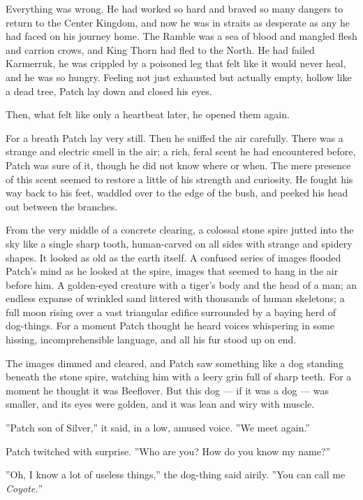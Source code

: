 \documentclass[12pt]{book}
\begin{document}
Everything was wrong. He had worked so hard and braved so many dangers
to return to the Center Kingdom, and now he was in straits as
desperate as any he had faced on his journey home. The Ramble was a
sea of blood and mangled flesh and carrion crows, and King Thorn had
fled to the North. He had failed Karmerruk, he was crippled by a
poisoned leg that felt like it would never heal, and he was so
hungry. Feeling not just exhausted but actually empty, hollow like a
dead tree, Patch lay down and closed his eyes.

Then, what felt like only a heartbeat later, he opened them again.

For a breath Patch lay very still. Then he sniffed the air
carefully. There was a strange and electric smell in the air; a rich,
feral scent he had encountered before, Patch was sure of it, though he
did not know where or when. The mere presence of this scent seemed to
restore a little of his strength and curiosity. He fought his way back
to his feet, waddled over to the edge of the bush, and peeked his head
out between the branches.

From the very middle of a concrete clearing, a colossal stone spire
jutted into the sky like a single sharp tooth, human-carved on all
sides with strange and spidery shapes. It looked as old as the earth
itself. A confused series of images flooded Patch's mind as he looked
at the spire, images that seemed to hang in the air before him. A
golden-eyed creature with a tiger's body and the head of a man; an
endless expanse of wrinkled sand littered with thousands of human
skeletons; a full moon rising over a vast triangular edifice
surrounded by a baying herd of dog-things. For a moment Patch thought
he heard voices whispering in some hissing, incomprehensible language,
and all his fur stood up on end.

The images dimmed and cleared, and Patch saw something like a dog
standing beneath the stone spire, watching him with a leery grin full
of sharp teeth. For a moment he thought it was Beeflover. But this dog
--- if it was a dog --- was smaller, and its eyes were golden, and it
was lean and wiry with muscle.

''Patch son of Silver,'' it said, in a low, amused voice. ''We meet
again.''

Patch twitched with surprise. ''Who are you? How do you know my
name?''

''Oh, I know a lot of useless things,'' the dog-thing said
airily. ''You can call me \textit{Coyote.}''
\end{document}
